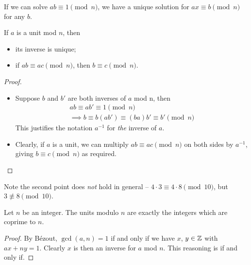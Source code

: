 \documentclass{../../template/note}
\begin{document}
    \begin{remark*}
        If we can solve \(ab \equiv 1 \pmod n\), we have a unique solution for \(ax \equiv b \pmod n\) for any \(b\).
    \end{remark*}
    
    \begin{proposition}
        If \(a\) is a unit mod \(n\), then
        \begin{itemize}
            \item its inverse is unique;
            \item if \(ab \equiv ac \pmod n\), then \(b \equiv c \pmod n\).
        \end{itemize}
    \end{proposition}
    
    \begin{proof}
        \begin{itemize}
            \item Suppose \(b\) and \(b'\) are both inverses of \(a\) mod n, then
            \begin{align*}
                ab \equiv ab' \equiv 1 \pmod n \\
                \implies b \equiv b(ab') \equiv (ba)b' \equiv b' \pmod n
            \end{align*}
            This justifies the notation \(a^{-1}\) for \emph{the} inverse of \(a\).
            \item Clearly, if \(a\) is a unit, we can multiply \(ab \equiv ac \pmod n\) on both sides by \(a^{-1}\), giving \(b \equiv c \pmod n\) as required.
        \end{itemize}
    \end{proof}
    Note the second point does \emph{not} hold in general -- \(4 \cdot 3 \equiv 4 \cdot 8 \pmod{10}\), but \(3 \not\equiv 8 \pmod{10}\).

    \begin{proposition}
        Let \(n\) be an integer. The units modulo \(n\) are exactly the integers which are coprime to \(n\).
    \end{proposition}
    
    \begin{proof}
        By B\'ezout, \(\gcd(a, n) = 1\) if and only if we have \(x\), \(y \in \mathbb Z\) with \(ax + ny = 1\). Clearly \(x\) is then an inverse for \(a\) mod \(n\). This reasoning is if and only if.
    \end{proof}
    
\end{document}
